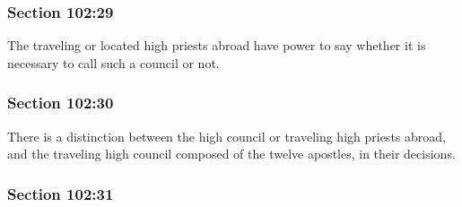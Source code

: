 
	\subsubsection{Section 102:29} %
		\label{DC102-29}

		The traveling or located high priests abroad have power to say whether it is necessary to call such a council or not.


	\subsubsection{Section 102:30} %
		\label{DC102-30}

		There is a distinction between the high council or traveling high priests abroad, and the traveling high council composed of the twelve apostles, in their decisions.


	\subsubsection{Section 102:31} %
		\label{DC102-31}

